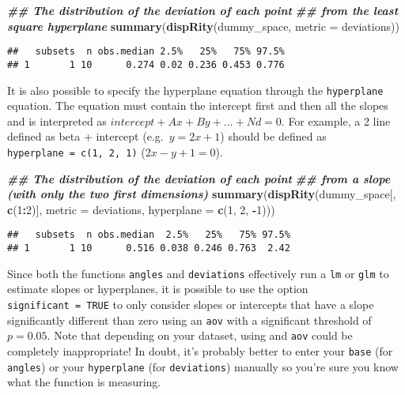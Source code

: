\documentclass[
]{book}
\newenvironment{Shaded}{\begin{snugshade}}{\end{snugshade}}
\newcommand{\AttributeTok}[1]{\textcolor[rgb]{0.13,0.29,0.53}{#1}}
\newcommand{\DecValTok}[1]{\textcolor[rgb]{0.00,0.00,0.81}{#1}}
\newcommand{\DocumentationTok}[1]{\textcolor[rgb]{0.56,0.35,0.01}{\textbf{\textit{#1}}}}
\newcommand{\FunctionTok}[1]{\textcolor[rgb]{0.13,0.29,0.53}{\textbf{#1}}}
\newcommand{\NormalTok}[1]{#1}
\newcommand{\SpecialCharTok}[1]{\textcolor[rgb]{0.81,0.36,0.00}{\textbf{#1}}}
\begin{document}
\begin{Shaded}
\begin{Highlighting}[]
\DocumentationTok{\#\# The distribution of the deviation of each point}
\DocumentationTok{\#\# from the least square hyperplane}
\FunctionTok{summary}\NormalTok{(}\FunctionTok{dispRity}\NormalTok{(dummy\_space, }\AttributeTok{metric =}\NormalTok{ deviations))}
\end{Highlighting}
\end{Shaded}

\begin{verbatim}
##   subsets  n obs.median 2.5%   25%   75% 97.5%
## 1       1 10      0.274 0.02 0.236 0.453 0.776
\end{verbatim}

It is also possible to specify the hyperplane equation through the \texttt{hyperplane} equation. The equation must contain the intercept first and then all the slopes and is interpreted as \(intercept + Ax + By + ... + Nd = 0\). For example, a 2 line defined as beta + intercept (e.g.~\(y = 2x + 1\)) should be defined as \texttt{hyperplane\ =\ c(1,\ 2,\ 1)} (\(2x - y + 1 = 0\)).

\begin{Shaded}
\begin{Highlighting}[]
\DocumentationTok{\#\# The distribution of the deviation of each point}
\DocumentationTok{\#\# from a slope (with only the two first dimensions)}
\FunctionTok{summary}\NormalTok{(}\FunctionTok{dispRity}\NormalTok{(dummy\_space[, }\FunctionTok{c}\NormalTok{(}\DecValTok{1}\SpecialCharTok{:}\DecValTok{2}\NormalTok{)], }\AttributeTok{metric =}\NormalTok{ deviations,}
                 \AttributeTok{hyperplane =} \FunctionTok{c}\NormalTok{(}\DecValTok{1}\NormalTok{, }\DecValTok{2}\NormalTok{, }\SpecialCharTok{{-}}\DecValTok{1}\NormalTok{)))}
\end{Highlighting}
\end{Shaded}

\begin{verbatim}
##   subsets  n obs.median  2.5%   25%   75% 97.5%
## 1       1 10      0.516 0.038 0.246 0.763  2.42
\end{verbatim}

Since both the functions \texttt{angles} and \texttt{deviations} effectively run a \texttt{lm} or \texttt{glm} to estimate slopes or hyperplanes, it is possible to use the option \texttt{significant\ =\ TRUE} to only consider slopes or intercepts that have a slope significantly different than zero using an \texttt{aov} with a significant threshold of \(p = 0.05\).
Note that depending on your dataset, using and \texttt{aov} could be completely inappropriate!
In doubt, it's probably better to enter your \texttt{base} (for \texttt{angles}) or your \texttt{hyperplane} (for \texttt{deviations}) manually so you're sure you know what the function is measuring.
\end{document}

